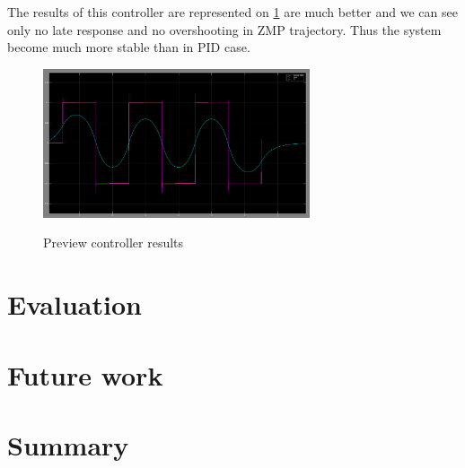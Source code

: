 \documentclass[12pt,a4paper]{report}
\begin{document}
		The results of this controller are represented on \cref{fig:19} are much better and we can see only no late response and no overshooting in ZMP trajectory. Thus the system become much more stable than in PID case. 
		
		\begin{figure}[h!]
			\vspace{-0.2cm}
			\centering
			{\includegraphics[width=0.7\textwidth]{19}}
			\caption{Preview controller results}
			\label{fig:19}
			\vspace{-0.1cm}
		\end{figure}
	\chapter{Evaluation}
	\chapter{Future work}
	\chapter{Summary}
	
	
	
	
\end{document}
